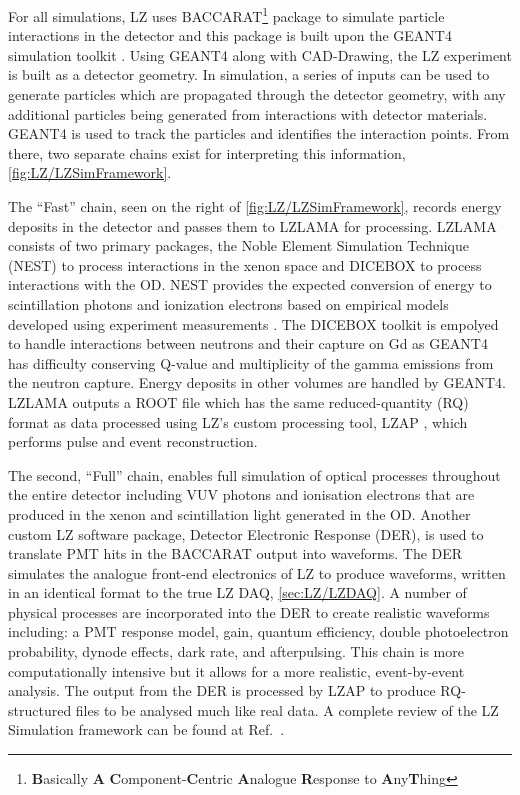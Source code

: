 For all simulations, LZ uses BACCARAT\footnote{\textbf{B}asically \textbf{A} \textbf{C}omponent-\textbf{C}entric \textbf{A}nalogue \textbf{R}esponse to \textbf{A}ny\textbf{T}hing}\cite{LZ_SIMS} package to simulate particle interactions in the detector and this package is built upon the GEANT4 simulation toolkit \cite{GEANT4:2002zbu}. Using GEANT4 along with CAD-Drawing, the LZ experiment is built as a detector geometry. In simulation, a series of inputs can be used to generate particles which are propagated through the detector geometry, with any additional particles being generated from interactions with detector materials. GEANT4 is used to track the particles and identifies the interaction points. From there, two separate chains exist for interpreting this information, \autoref{fig:LZ/LZSimFramework}.

The ``Fast'' chain, seen on the right of \autoref{fig:LZ/LZSimFramework}, records energy deposits in the detector and passes them to LZLAMA for processing. LZLAMA consists of two primary packages, the Noble Element Simulation Technique (NEST) to process interactions in the xenon space and DICEBOX to process interactions with the OD. NEST provides the expected conversion of energy to scintillation photons and ionization electrons based on empirical models developed using experiment measurements \cite{NEST1}. The DICEBOX toolkit is empolyed to handle interactions between neutrons and their capture on Gd as GEANT4 has difficulty conserving Q-value and multiplicity of the gamma emissions from the neutron capture. Energy deposits in other volumes are handled by GEANT4. LZLAMA outputs a ROOT file which has the same reduced-quantity (RQ) format as data processed using LZ's custom processing tool, LZAP \cite{LZ_SIMS}, which performs pulse and event reconstruction.

The second, ``Full'' chain, enables full simulation of optical processes throughout the entire detector including VUV photons and ionisation electrons that are produced in the xenon and scintillation light generated in the OD. Another custom LZ software package, Detector Electronic Response (DER), is used to translate PMT hits in the BACCARAT output into waveforms. The DER simulates the analogue front-end electronics of LZ to produce waveforms, written in an identical format to the true LZ DAQ, \autoref{sec:LZ/LZDAQ}. A number of physical processes are incorporated into the DER to create realistic waveforms including: a PMT response model, gain, quantum efficiency, double photoelectron probability, dynode effects, dark rate, and afterpulsing. This chain is more computationally intensive but it allows for a more realistic, event-by-event analysis. The output from the DER is processed by LZAP to produce RQ-structured files to be analysed much like real data.
A complete review of the LZ Simulation framework can be found at Ref.~\cite{LZ_SIMS}.

